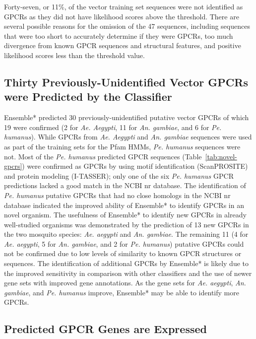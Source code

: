 Forty-seven, or 11\%, of the vector training set sequences were not identified as GPCRs as they did not have likelihood scores above the threshold. There are several possible reasons for the omission of the 47 sequences, including sequences that were too short to accurately determine if they were GPCRs, too much divergence from known GPCR sequences and structural features, and positive likelihood scores less than the threshold value.


\subsection{Thirty Previously-Unidentified Vector GPCRs were Predicted by the Classifier}

Ensemble* predicted 30 previously-unidentified putative vector GPCRs of which 19 were confirmed (2 for \emph{Ae. Aegypti}, 11 for \emph{An. gambiae}, and 6 for \emph{Pe. humanus}).  While GPCRs from \emph{Ae. Aegypti} and \emph{An. gambiae} sequences were used as part of the training sets for the Pfam HMMs, \emph{Pe. humanus} sequences were not.  Most of the \emph{Pe. humanus} predicted GPCR sequences (Table~\ref{tab:novel-gpcrs}) were confirmed as GPCRs by using motif identification (ScanPROSITE) and protein modeling (I-TASSER); only one of the six \emph{Pe. humanus} GPCR predictions lacked a good match in the NCBI nr database. The identification of \emph{Pe. humanus} putative GPCRs that had no close homologs in the NCBI nr database indicated the improved ability of Ensemble* to identify GPCRs in an novel organism. The usefulness of Ensemble* to identify new GPCRs in already well-studied organisms was demonstrated by the prediction of 13 new GPCRs in the two mosquito species: \emph{Ae. aegypti}  and \emph{An. gambiae}.  The remaining 11 (4 for \emph{Ae. aegypti}, 5 for \emph{An. gambiae}, and 2 for \emph{Pe. humanus}) putative GPCRs could not be confirmed due to low levels of similarity to known GPCR structures or sequences. The identification of additional GPCRs by Ensemble* is likely due to the improved sensitivity in comparison with other classifiers and the use of newer gene sets with improved gene annotations. As the gene sets for \emph{Ae. aegypti}, \emph{An. gambiae}, and \emph{Pe. humanus} improve, Ensemble* may be able to identify more GPCRs.

\subsection{Predicted GPCR Genes are Expressed}

